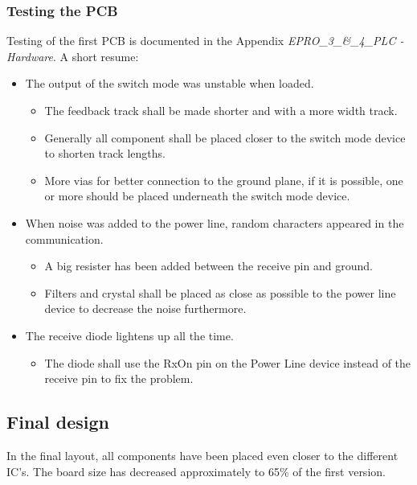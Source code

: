 \subsubsection{Testing the PCB}
Testing of the first PCB is documented in the Appendix \textit{EPRO\_3\_\&\_4\_PLC - Hardware}. A short resume:
\begin{itemize}
	\item The output of the switch mode was unstable when loaded. 
	\begin{itemize}
		\item The feedback track shall be made shorter and with a more width track. 
		\item Generally all component shall be placed closer to the switch mode device to shorten track lengths. 
		\item More vias for better connection to the ground plane, if it is possible, one or more should be placed underneath the switch mode device.
	\end{itemize}
	\item When noise was added to the power line, random characters appeared in the communication.
	\begin{itemize}
		\item A big resister has been added between the receive pin and ground.
		\item Filters and crystal shall be placed as close as possible to the power line device to decrease the noise furthermore.
	\end{itemize} 
	\item The receive diode lightens up all the time.
	\begin{itemize}
		\item The diode shall use the RxOn pin on the Power Line device instead of the receive pin to fix the problem.
	\end{itemize}
\end{itemize}

\subsection{Final design}
In the final layout, all components have been placed even closer to the different IC's. The board size has decreased approximately to 65\% of the first version. 



